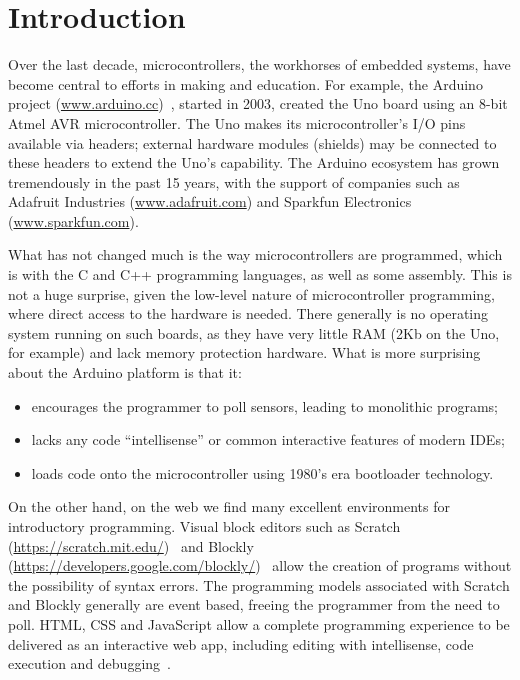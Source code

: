\section{Introduction}
\label{sec:intro}

Over the last decade, microcontrollers, the workhorses of embedded systems, have become
central to efforts in making and education. For example, the Arduino project
(\url{www.arduino.cc})~\cite{buildingArduino2014},
started in 2003, created the Uno board using an 8-bit Atmel
AVR microcontroller. The Uno makes its microcontroller's I/O pins available via headers;
external hardware modules (shields) may be connected to these headers to extend
the Uno's capability. The Arduino ecosystem has grown tremendously in the past 15 years,
with the support of companies such as Adafruit Industries (\url{www.adafruit.com}) and
Sparkfun Electronics (\url{www.sparkfun.com}).

What has not changed much is the way microcontrollers are programmed,
which is with the C and C++ programming languages, as well as some assembly.
This is not a huge surprise, given the low-level nature of microcontroller programming,
where direct access to the hardware is needed. There generally is no operating
system running on such boards, as they have very little RAM (2Kb on the Uno, for example) and
lack memory protection hardware. What is more surprising about the Arduino platform is that
it:
\begin{itemize}
\item encourages the programmer to poll sensors,
leading to monolithic programs;
\item lacks any code ``intellisense'' or common interactive features of modern IDEs;
\item loads code onto the microcontroller using 1980's era bootloader technology.
\end{itemize}
On the other hand, on the web we find many excellent environments for introductory programming.
Visual block editors such as Scratch (\url{https://scratch.mit.edu/})~\cite{ScratchCACM2009,BlocksBeyondCACM2017}
and Blockly (\url{https://developers.google.com/blockly/})~\cite{Blocky2015}
allow the creation of programs without the possibility of syntax errors.
The programming models associated with Scratch and Blockly generally are
event based, freeing the programmer from the need to poll.
HTML, CSS and JavaScript allow a complete programming experience to be delivered as an interactive
web app, including editing with intellisense, code execution and debugging~\cite{Monaco}.

